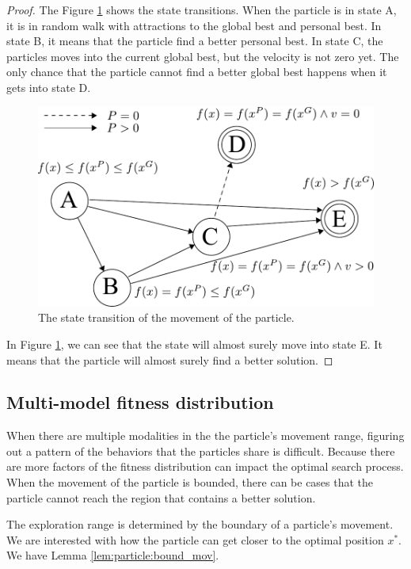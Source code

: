 \begin{mythm}
\begin{proof}
The Figure \ref{fig:fsm} shows the state transitions.
When the particle is in state A, it is in random walk with attractions to the global best and personal best.
In state B, it means that the particle find a better personal best.
In state C, the particles moves into the current global best, but the velocity is not zero yet.
The only chance that the particle cannot find a better global best happens when it gets into state D.

\begin{figure}[tbph]
\centering
\includegraphics[width=0.7\linewidth]{./fig/fsm}
\caption{The state transition of the movement of the particle.}
\label{fig:fsm}
\end{figure}

In Figure \ref{fig:fsm}, we can see that the state will almost surely move into state E.
It means that the particle will almost surely find a better solution.
\end{proof}
\end{mythm}

\subsection{Multi-model fitness distribution}

When there are multiple modalities in the the particle's movement range, figuring out a pattern of the behaviors that the particles share is difficult.
Because there are more factors of the fitness distribution can impact the optimal search process.
When the movement of the particle is bounded, there can be cases that the particle cannot reach the region that contains a better solution.

The exploration range is determined by the boundary of a particle's movement.
We are interested with how the particle can get closer to the optimal position $ x^{*} $.
We have Lemma \ref{lem:particle:bound_mov}.

